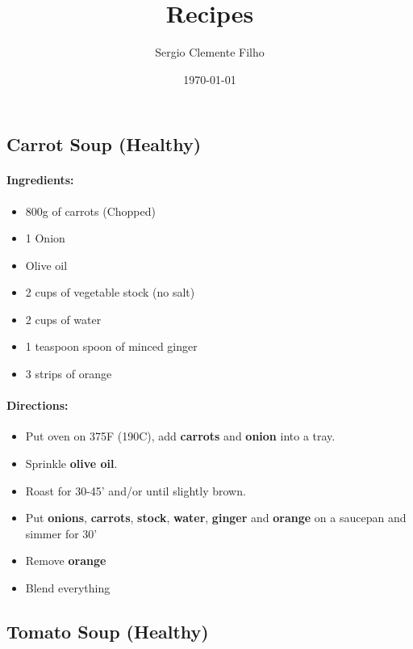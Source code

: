 \documentclass{article}
\title{Recipes}
\author{Sergio Clemente Filho}
\date{\today}
\begin{document}
\maketitle

\newpage

\tableofcontents{}

\newpage

\subsection{Carrot Soup (Healthy)}

\paragraph{Ingredients:}
\begin{itemize}
	\item 800g of carrots (Chopped)
	\item 1 Onion
	\item Olive oil
	\item 2 cups of vegetable stock (no salt)
	\item 2 cups of water
	\item 1 teaspoon spoon of minced ginger
	\item 3 strips of orange
\end{itemize}

\paragraph{Directions:}
\begin{itemize}
	\item Put oven on 375F (190C), add \textbf{carrots} and \textbf{onion} into a tray.
	\item Sprinkle \textbf{olive oil}.
	\item Roast for 30-45' and/or until slightly brown.
	\item Put \textbf{onions}, \textbf{carrots}, \textbf{stock}, \textbf{water}, \textbf{ginger} and \textbf{orange} on a saucepan and simmer for 30'
	\item Remove \textbf{orange}
	\item Blend everything
\end{itemize}

\subsection{Tomato Soup (Healthy)}
\end{document}
